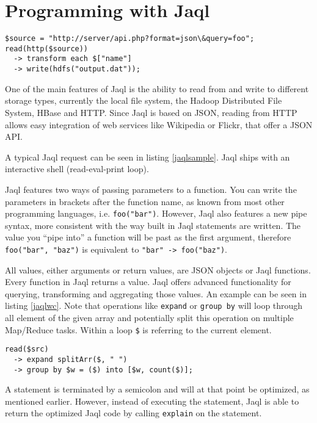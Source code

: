 \section{Programming with Jaql}

\begin{lstlisting}[language=jaql,caption=A sample Jaql query,label=jaqlsample]
$source = "http://server/api.php?format=json\&query=foo";
read(http($source)) 
  -> transform each $["name"]
  -> write(hdfs("output.dat"));
\end{lstlisting}

One of the main features of Jaql is the ability to read from and write to different
storage types, currently the local file system, the Hadoop Distributed File System,
HBase and HTTP. Since Jaql is based on JSON, reading
from HTTP allows easy integration of web services like Wikipedia or Flickr, that offer
a JSON API.

A typical Jaql request can be seen in listing \ref{jaqlsample}. Jaql ships with an
interactive shell (read-eval-print loop). 

Jaql features two ways of passing parameters to a function. You can write the parameters
in brackets after the function name, as known from most other programming languages, i.e.
\lstinline[language=jaql]!foo("bar")!. However, Jaql also features a new pipe syntax, more
consistent with the way built in Jaql statements are written. The value you ``pipe into''
a function will be past as the first argument, therefore \lstinline[language=jaql]!foo("bar", "baz")!
is equivalent to \lstinline[language=jaql]!"bar" -> foo("baz")!.

All values, either arguments or return values, are JSON objects or Jaql functions.
Every function in Jaql returns a value. Jaql offers advanced functionality for querying, transforming
and aggregating those values. An example can be seen in listing \ref{jaqlwc}. Note that
operations like {\tt expand} or {\tt group by} will loop through all element of the given array
and potentially split this operation on multiple Map/Reduce tasks. Within a loop {\tt\$} is referring
to the current element.

\begin{lstlisting}[language=jaql,caption=Wordcount in Jaql,label=jaqlwc]
read($src)
  -> expand splitArr($, " ")
  -> group by $w = ($) into [$w, count($)];
\end{lstlisting}

A statement is terminated by a semicolon and will at that point be optimized, as mentioned earlier.
However, instead of executing the statement, Jaql is able to return the optimized Jaql code by calling
{\tt explain} on the statement.